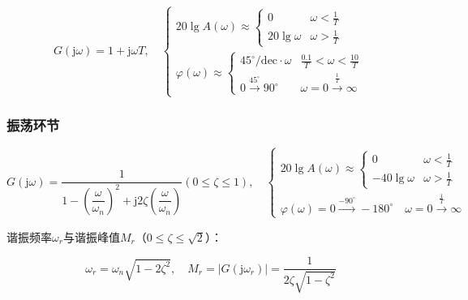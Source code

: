 \documentclass[cn, blue, normal, 12pt]{elegantnote}
\begin{document}
\begin{equation}
    G(\mathrm{j}\omega)=1+\mathrm{j}\omega T, \quad 
    \left\{
        \begin{array}{l}
            20\lg{A(\omega)}\approx\left\{
                \begin{array}{ll}
                    0 & \omega<\frac{1}{T} \\
                    20\lg{\omega} & \omega>\frac{1}{T}
                \end{array}
            \right. \\
            \varphi(\omega)\approx\left\{
                \begin{array}{ll}
                    45^{\circ}/\mathrm{dec}\cdot\omega & \frac{0.1}{T}<\omega<\frac{10}{T} \\
                    0 \stackrel{45^{\circ}}{\rightarrow} 90^{\circ} & \omega=0 \stackrel{\frac{1}{T}}{\rightarrow} \infty
                \end{array}
            \right.
        \end{array}
    \right.
\end{equation}

\subsubsection{振荡环节}

\begin{equation}
    G(\mathrm{j}\omega)=\frac{1}{1-\left(\dfrac{\omega}{\omega_n}\right)^2+\mathrm{j}2\zeta\left(\dfrac{\omega}{\omega_n}\right)} (0\leq \zeta\leq 1), \quad 
    \left\{
        \begin{array}{l}
            20\lg{A(\omega)}\approx\left\{
                \begin{array}{ll}
                    0 & \omega<\frac{1}{T} \\
                    -40\lg{\omega} & \omega>\frac{1}{T}
                \end{array}
            \right. \\
            \varphi(\omega)=0 \stackrel{-90^{\circ}}{\rightarrow} -180^{\circ} \quad \omega=0  \stackrel{\frac{1}{T}}{\rightarrow} \infty
        \end{array}
    \right.
\end{equation}

谐振频率$\omega_r$与谐振峰值$M_r$（$0\leq\zeta\leq\sqrt{2}$）：

\begin{equation}
    \omega_r=\omega_n\sqrt{1-2\zeta^2}, \quad M_r=|G(\mathrm{j}\omega_r)|=\frac{1}{2\zeta\sqrt{1-\zeta^2}}
\end{equation}
\end{document}
